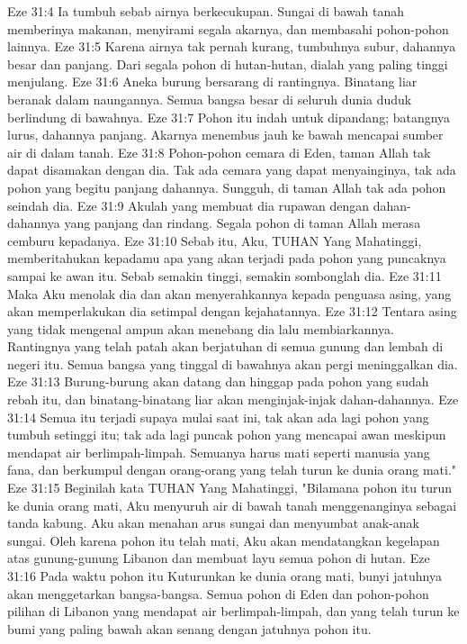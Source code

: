 Eze 31:4  Ia tumbuh sebab airnya berkecukupan. Sungai di bawah tanah memberinya makanan, menyirami segala akarnya, dan membasahi pohon-pohon lainnya.
Eze 31:5  Karena airnya tak pernah kurang, tumbuhnya subur, dahannya besar dan panjang. Dari segala pohon di hutan-hutan, dialah yang paling tinggi menjulang.
Eze 31:6  Aneka burung bersarang di rantingnya. Binatang liar beranak dalam naungannya. Semua bangsa besar di seluruh dunia duduk berlindung di bawahnya.
Eze 31:7  Pohon itu indah untuk dipandang; batangnya lurus, dahannya panjang. Akarnya menembus jauh ke bawah mencapai sumber air di dalam tanah.
Eze 31:8  Pohon-pohon cemara di Eden, taman Allah tak dapat disamakan dengan dia. Tak ada cemara yang dapat menyainginya, tak ada pohon yang begitu panjang dahannya. Sungguh, di taman Allah tak ada pohon seindah dia.
Eze 31:9  Akulah yang membuat dia rupawan dengan dahan-dahannya yang panjang dan rindang. Segala pohon di taman Allah merasa cemburu kepadanya.
Eze 31:10  Sebab itu, Aku, TUHAN Yang Mahatinggi, memberitahukan kepadamu apa yang akan terjadi pada pohon yang puncaknya sampai ke awan itu. Sebab semakin tinggi, semakin sombonglah dia.
Eze 31:11  Maka Aku menolak dia dan akan menyerahkannya kepada penguasa asing, yang akan memperlakukan dia setimpal dengan kejahatannya.
Eze 31:12  Tentara asing yang tidak mengenal ampun akan menebang dia lalu membiarkannya. Rantingnya yang telah patah akan berjatuhan di semua gunung dan lembah di negeri itu. Semua bangsa yang tinggal di bawahnya akan pergi meninggalkan dia.
Eze 31:13  Burung-burung akan datang dan hinggap pada pohon yang sudah rebah itu, dan binatang-binatang liar akan menginjak-injak dahan-dahannya.
Eze 31:14  Semua itu terjadi supaya mulai saat ini, tak akan ada lagi pohon yang tumbuh setinggi itu; tak ada lagi puncak pohon yang mencapai awan meskipun mendapat air berlimpah-limpah. Semuanya harus mati seperti manusia yang fana, dan berkumpul dengan orang-orang yang telah turun ke dunia orang mati."
Eze 31:15  Beginilah kata TUHAN Yang Mahatinggi, "Bilamana pohon itu turun ke dunia orang mati, Aku menyuruh air di bawah tanah menggenanginya sebagai tanda kabung. Aku akan menahan arus sungai dan menyumbat anak-anak sungai. Oleh karena pohon itu telah mati, Aku akan mendatangkan kegelapan atas gunung-gunung Libanon dan membuat layu semua pohon di hutan.
Eze 31:16  Pada waktu pohon itu Kuturunkan ke dunia orang mati, bunyi jatuhnya akan menggetarkan bangsa-bangsa. Semua pohon di Eden dan pohon-pohon pilihan di Libanon yang mendapat air berlimpah-limpah, dan yang telah turun ke bumi yang paling bawah akan senang dengan jatuhnya pohon itu.
